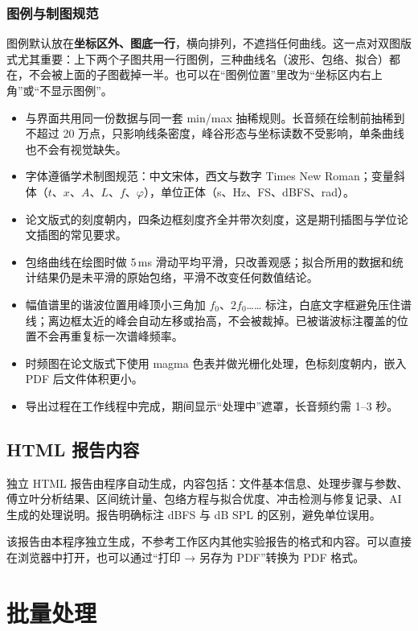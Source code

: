 \documentclass[UTF8,a4paper,12pt,scheme=chinese]{ctexart}
\begin{document}
\subsubsection*{图例与制图规范}

图例默认放在\textbf{坐标区外、图底一行}，横向排列，不遮挡任何曲线。这一点对双图版式尤其重要：上下两个子图共用一行图例，三种曲线名（波形、包络、拟合）都在，不会被上面的子图截掉一半。也可以在“图例位置”里改为“坐标区内右上角”或“不显示图例”。

\begin{itemize}
  \item 与界面共用同一份数据与同一套 min/max 抽稀规则。长音频在绘制前抽稀到不超过 20 万点，只影响线条密度，峰谷形态与坐标读数不受影响，单条曲线也不会有视觉缺失。
  \item 字体遵循学术制图规范：中文宋体，西文与数字 Times New Roman；变量斜体（$t$、$x$、$A$、$L$、$f$、$\varphi$），单位正体（s、Hz、FS、dBFS、rad）。
  \item 论文版式的刻度朝内，四条边框刻度齐全并带次刻度，这是期刊插图与学位论文插图的常见要求。
  \item 包络曲线在绘图时做 5\,ms 滑动平均平滑，只改善观感；拟合所用的数据和统计结果仍是未平滑的原始包络，平滑不改变任何数值结论。
  \item 幅值谱里的谐波位置用峰顶小三角加 $f_0$、$2f_0$…… 标注，白底文字框避免压住谱线；离边框太近的峰会自动左移或抬高，不会被裁掉。已被谐波标注覆盖的位置不会再重复标一次谱峰频率。
  \item 时频图在论文版式下使用 magma 色表并做光栅化处理，色标刻度朝内，嵌入 PDF 后文件体积更小。
  \item 导出过程在工作线程中完成，期间显示“处理中”遮罩，长音频约需 1--3 秒。
\end{itemize}


\subsection{HTML 报告内容}

独立 HTML 报告由程序自动生成，内容包括：文件基本信息、处理步骤与参数、傅立叶分析结果、区间统计量、包络方程与拟合优度、冲击检测与修复记录、AI 生成的处理说明。报告明确标注 dBFS 与 dB SPL 的区别，避免单位误用。

该报告由本程序独立生成，不参考工作区内其他实验报告的格式和内容。可以直接在浏览器中打开，也可以通过“打印 → 另存为 PDF”转换为 PDF 格式。

\section{批量处理}
\end{document}

